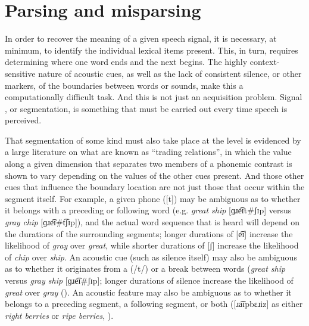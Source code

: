 \section{Parsing and misparsing}

In order to recover the meaning of a given speech signal, it is necessary,
at minimum, to identify the individual lexical items present. This,
in turn, requires determining where one word ends and the next begins.
The highly context-sensitive nature of acoustic cues, as well as the
lack of consistent silence, or other markers, of the boundaries between
words or sounds, make this a computationally difficult task. And this
is not just an acquisition problem. Signal , or segmentation,
is something that must be carried out every time speech is perceived. 

That segmentation of some kind must also take place at the 
level is evidenced by a large literature on what are known as “trading
relations”, in which the value along a given  dimension
that separates two members of a phonemic contrast is shown to vary
depending on the values of the other  cues present. And those
other cues that influence the boundary location are not just those
that occur within the segment itself. For example, a given phone ({[t]})
may be ambiguous as to whether it belongs with a preceding or following
word (e.g. \textit{great ship} {[}{ɡɹe͡ɪt}\#{ʃɪp}{]}
versus \textit{gray chip} {[}{ɡɹe͡ɪ}\#{t͡ʃɪp}{]}),
and the actual word sequence that is heard will depend on the durations
of the surrounding segments; longer durations of {[e͡ɪ]}
increase the likelihood of \textit{gray} over \textit{great}, while
shorter durations of {[ʃ]} increase the likelihood of \textit{chip}
over \textit{ship}. An acoustic cue (such as silence itself) may also
be ambiguous as to whether it originates from a  ({/t/})
or a break between words (\textit{great ship} versus \textit{gray ship}
{[}{ɡɹe͡ɪ}\#{ʃɪp}{]}; longer durations of silence
increase the likelihood of \textit{great} over \textit{gray} (\citealt{repp1978perceptual}).
An acoustic feature may also be ambiguous as to whether it belongs
to a preceding segment, a following segment, or both ({[}{ɹa͡ɪpbɛɹiz}{]}
as either \textit{right berries} or \textit{ripe berries}, \citealt{Gow2003}). 

